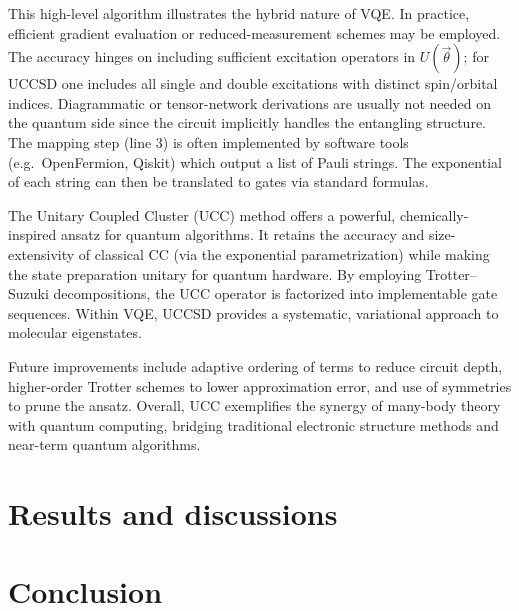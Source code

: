 \documentclass[twocolumn,superscriptaddress,unsortedaddress,nofootinbib,amsmath,amssymb,
aps,floatfix]{revtex4-2}
\begin{document}
This high-level algorithm illustrates the hybrid nature of VQE.  In practice, efficient gradient evaluation or reduced-measurement schemes may be employed.  The accuracy hinges on including sufficient excitation operators in $U(\vec\theta)$; for UCCSD one includes all single and double excitations with distinct spin/orbital indices.  Diagrammatic or tensor-network derivations are usually not needed on the quantum side since the circuit implicitly handles the entangling structure.  The mapping step (line 3) is often implemented by software tools (e.g.\ OpenFermion, Qiskit) which output a list of Pauli strings.  The exponential of each string can then be translated to gates via standard formulas.

The Unitary Coupled Cluster (UCC) method offers a powerful,
chemically-inspired ansatz for quantum algorithms.  It retains the
accuracy and size-extensivity of classical CC (via the exponential
parametrization) while making the state preparation unitary for
quantum hardware.  By employing Trotter–Suzuki decompositions, the UCC
operator is factorized into implementable gate sequences.  Within VQE,
UCCSD provides a systematic, variational approach to molecular
eigenstates.

Future improvements include adaptive ordering of terms to reduce
circuit depth, higher-order Trotter schemes to lower approximation
error, and use of symmetries to prune the ansatz.  Overall, UCC
exemplifies the synergy of many-body theory with quantum computing,
bridging traditional electronic structure methods and near-term
quantum algorithms.


\section{Results and discussions}


\section{Conclusion}
\end{document}
